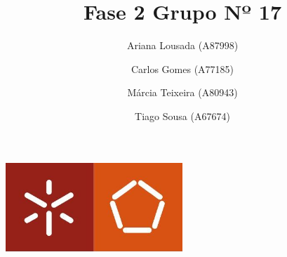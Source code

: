 \documentclass[a4paper]{report}
\begin{document}
\title{Fase 2 \break
\large Grupo Nº 17}
\author{Ariana Lousada (A87998) \and Carlos Gomes (A77185) \and Márcia Teixeira (A80943) \and Tiago Sousa (A67674)}

\begin{center}
    \begin{minipage}{0.75\linewidth}
        \centering
        \includegraphics[width=0.5\textwidth]{images/logo.png}\par\vspace{1cm}
        \vspace{1cm}
        \href{https://www.uminho.pt/}
        {\color{black}{\scshape\LARGE Universidade do Minho}}\par\vspace{1cm}
        \href{https://www.di.uminho.pt/}
        {\color{black}{\scshape\Large Departamento de Informática}} \par
        \maketitle
    \end{minipage}
\end{center}
\end{document}
